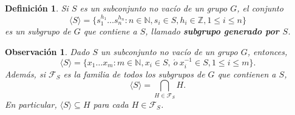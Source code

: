 \documentclass[12pt]{article}
\newtheorem{definition}[theorem]{Definición}
\newtheorem{observation}{Observación}[theorem]
\begin{document}
\begin{definition}Si $S$ es un subconjunto no vacío de un grupo $G$, el conjunto $$\langle S \rangle = \lbrace s_1^{h_1} \ldots s_n^{h_n}: n \in \mathbb{N}, s_i \in S, h_i \in \mathbb{Z}, 1 \leq i \leq n \rbrace$$ es un subgrupo de $G$ que contiene a $S$, llamado \textbf{subgrupo generado por $S$}.
\end{definition}

\begin{observation}Dado $S$ un subconjunto no vacío de un grupo $G$, entonces, $$\langle S \rangle = \lbrace x_1 \ldots x_m: m \in \mathbb{N}, x_i \in S,~\acute{o}~ x_i^{-1} \in S, 1 \leq i \leq m \rbrace.$$ Además, si $\mathcal{F}_S$ es la familia de todos los subgrupos de $G$ que contienen a $S$, $$\langle S \rangle = \bigcap_{H \in \mathcal{F}_S} H.$$ En particular, $\langle S \rangle \subseteq H$ para cada $H \in \mathcal{F}_S$.
\end{observation}
\end{document}
